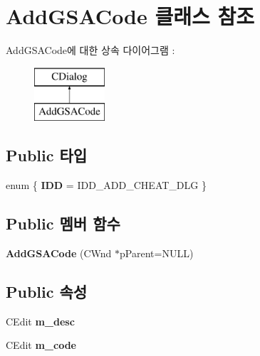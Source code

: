 \hypertarget{class_add_g_s_a_code}{}\section{Add\+G\+S\+A\+Code 클래스 참조}
\label{class_add_g_s_a_code}
Add\+G\+S\+A\+Code에 대한 상속 다이어그램 \+: \begin{figure}[H]
\begin{center}
\leavevmode
\includegraphics[height=2.000000cm]{class_add_g_s_a_code}
\end{center}
\end{figure}
\subsection*{Public 타입}
\begin{DoxyCompactItemize}
\item 
\mbox{\label{class_add_g_s_a_code_ae09fbbcc1c447c677bf62ee2bcf7c945}} 
enum \{ {\bfseries I\+DD} = I\+D\+D\+\_\+\+A\+D\+D\+\_\+\+C\+H\+E\+A\+T\+\_\+\+D\+LG
 \}
\end{DoxyCompactItemize}
\subsection*{Public 멤버 함수}
\begin{DoxyCompactItemize}
\item 
\mbox{\label{class_add_g_s_a_code_adae37d67fa94fcd376ae11c6d9bd9d01}} 
{\bfseries Add\+G\+S\+A\+Code} (C\+Wnd $\ast$p\+Parent=N\+U\+LL)
\end{DoxyCompactItemize}
\subsection*{Public 속성}
\begin{DoxyCompactItemize}
\item 
\mbox{\label{class_add_g_s_a_code_a766cb9061a235616a856d3c1b16879db}} 
C\+Edit {\bfseries m\+\_\+desc}
\item 
\mbox{\label{class_add_g_s_a_code_a0a4c3486121bd6be93e8f64215fea1ab}} 
C\+Edit {\bfseries m\+\_\+code}
\end{DoxyCompactItemize}
